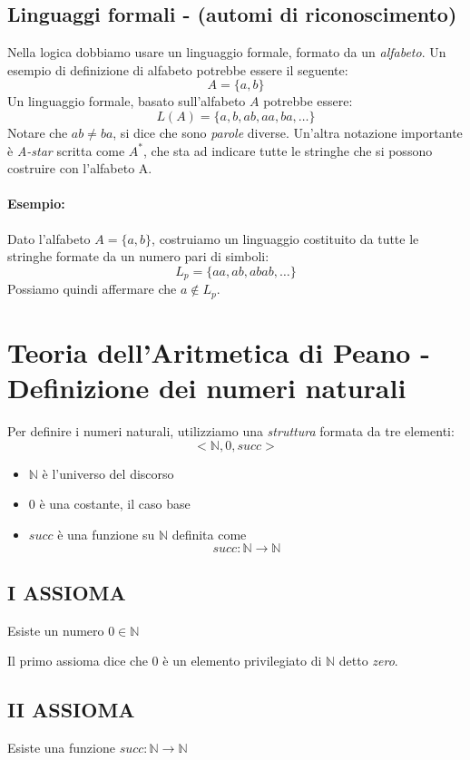\documentclass[a4paper,12pt]{report}
\begin{document}
\subsection{Linguaggi formali - (automi di riconoscimento)}

Nella logica dobbiamo usare un linguaggio formale, formato da un \emph{alfabeto}. Un esempio di definizione di alfabeto potrebbe essere il seguente:
\[ A = \{a, b\} \]
Un linguaggio formale, basato sull'alfabeto $A$ potrebbe essere:
\[ L(A) = \{a, b, ab, aa, ba, \dots \} \]
Notare che $ab \ne ba$, si dice che sono \emph{parole} diverse.
Un'altra notazione importante \`{e} \emph{A-star} scritta come $A^{*}$, che sta ad indicare tutte le stringhe che si possono costruire con l'alfabeto A.
\paragraph{Esempio:}

Dato l'alfabeto $A = \{a, b\}$, costruiamo un linguaggio costituito da tutte le stringhe formate da un numero pari di simboli:
\[ L_p = \{aa, ab, abab, \dots\} \]
Possiamo quindi affermare che $a \notin L_p$.


\section{Teoria dell'Aritmetica di Peano - Definizione dei numeri naturali}

Per definire i numeri naturali, utilizziamo una \emph{struttura} formata da tre elementi:
\[ <\mathbb{N}, 0, succ> \]
\begin{itemize}
\item $\mathbb{N}$ \`{e} l'universo del discorso
\item $0$ \`{e} una costante, il caso base
\item $succ$ \`{e} una funzione su $\mathbb{N}$ definita come \[ succ: \mathbb{N} \rightarrow \mathbb{N} \]
\end{itemize}

\subsection{I ASSIOMA}

\begin{center} Esiste un numero $0 \in \mathbb{N}$ \end{center}
Il primo assioma dice che $0$ \`{e} un elemento privilegiato di $\mathbb{N}$ detto \emph{zero}.

\subsection{II ASSIOMA}
\begin{center} Esiste una funzione $succ:  \mathbb{N} \rightarrow \mathbb{N}$ \end{center}
\end{document}
